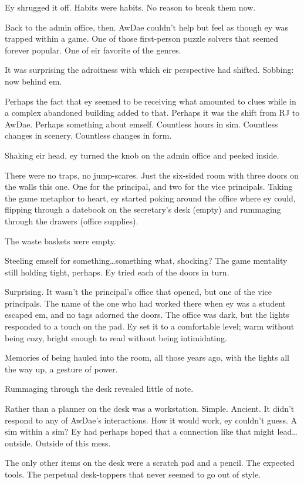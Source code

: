 Ey shrugged it off. Habits were habits. No reason to break them now.

Back to the admin office, then. AwDae couldn't help but feel as though ey was trapped within a game. One of those first-person puzzle solvers that seemed forever popular. One of eir favorite of the genres.

It was surprising the adroitness with which eir perspective had shifted. Sobbing: now behind em.

Perhaps the fact that ey seemed to be receiving what amounted to clues while in a complex abandoned building added to that. Perhaps it was the shift from RJ to AwDae. Perhaps something about emself. Countless hours in sim. Countless changes in scenery. Countless changes in form.

Shaking eir head, ey turned the knob on the admin office and peeked inside.

There were no traps, no jump-scares. Just the six-sided room with three doors on the walls this one. One for the principal, and two for the vice principals. Taking the game metaphor to heart, ey started poking around the office where ey could, flipping through a datebook on the secretary's desk (empty) and rummaging through the drawers (office supplies).

The waste baskets were empty.

Steeling emself for something\ldots{}something what, shocking? The game mentality still holding tight, perhaps. Ey tried each of the doors in turn.

Surprising. It wasn't the principal's office that opened, but one of the vice principals. The name of the one who had worked there when ey was a student escaped em, and no tags adorned the doors. The office was dark, but the lights responded to a touch on the pad. Ey set it to a comfortable level; warm without being cozy, bright enough to read without being intimidating.

Memories of being hauled into the room, all those years ago, with the lights all the way up, a gesture of power.

Rummaging through the desk revealed little of note.

Rather than a planner on the desk was a workstation. Simple. Ancient. It didn't respond to any of AwDae's interactions. How it would work, ey couldn't guess. A sim within a sim? Ey had perhaps hoped that a connection like that might lead\ldots{}outside. Outside of this mess.

The only other items on the desk were a scratch pad and a pencil. The expected tools. The perpetual desk-toppers that never seemed to go out of style.

